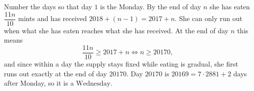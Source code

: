 Number the days so that day $1$ is the Monday. By the end of day $n$ she has eaten $\dfrac{11n}{10}$ mints and has received $2018+(n-1)=2017+n$. She can only run out when what she has eaten reaches what she has received. At the end of day $n$ this means
\[\dfrac{11n}{10}\ge2017+n\iff n\ge20170,\]
and since within a day the supply stays fixed while eating is gradual, she first runs out exactly at the end of day $20170$. Day $20170$ is $20169=7\cdot2881+2$ days after Monday, so it is a $\boxed{\text{Wednesday}}$.

